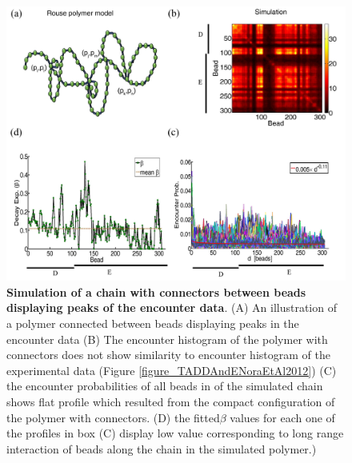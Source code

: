 \documentclass[12pt]{article}
\begin{document}
\begin{figure}[H]
\includegraphics[scale=0.5]{Figure02_LoopsCorrespondingToPeaks307Beads}
\caption{\textbf{Simulation of a chain with connectors between beads displaying peaks of the encounter data}. (A) An illustration of a polymer connected between beads displaying peaks in the encounter data (B) The encounter histogram of the polymer with connectors does not show similarity to encounter histogram of the experimental data (Figure \ref{figure_TADDAndENoraEtAl2012}) (C) the encounter probabilities of all beads in of the simulated chain shows flat profile which resulted from the compact configuration of the polymer with connectors. (D) the fitted$\beta$ values for each one of the profiles in box (C) display low value corresponding to long range interaction of beads along the chain in the simulated polymer.)}
\label{figure_encounterProbabilityPeaksOfTheEncounterData}
\end{figure}
\end{document}
